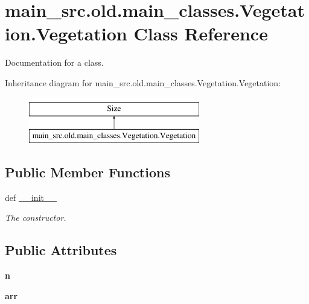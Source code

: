 \hypertarget{classmain__src_8old_1_1main__classes_1_1Vegetation_1_1Vegetation}{\section{main\-\_\-src.\-old.\-main\-\_\-classes.\-Vegetation.\-Vegetation Class Reference}
\label{classmain__src_8old_1_1main__classes_1_1Vegetation_1_1Vegetation}
}


Documentation for a class.  


Inheritance diagram for main\-\_\-src.\-old.\-main\-\_\-classes.\-Vegetation.\-Vegetation\-:\begin{figure}[H]
\begin{center}
\leavevmode
\includegraphics[height=2.000000cm]{classmain__src_8old_1_1main__classes_1_1Vegetation_1_1Vegetation}
\end{center}
\end{figure}
\subsection*{Public Member Functions}
\begin{DoxyCompactItemize}
\item 
def \hyperlink{classmain__src_8old_1_1main__classes_1_1Vegetation_1_1Vegetation_a2febd5ca1055f20d4e46581d9da806da}{\-\_\-\-\_\-init\-\_\-\-\_\-}
\begin{DoxyCompactList}\small\item\em The constructor. \end{DoxyCompactList}\end{DoxyCompactItemize}
\subsection*{Public Attributes}
\begin{DoxyCompactItemize}
\item 
\hypertarget{classmain__src_8old_1_1main__classes_1_1Vegetation_1_1Vegetation_a062777f397a40ebc13ccc6ea6d3190d6}{{\bfseries n}}\label{classmain__src_8old_1_1main__classes_1_1Vegetation_1_1Vegetation_a062777f397a40ebc13ccc6ea6d3190d6}

\item 
\hypertarget{classmain__src_8old_1_1main__classes_1_1Vegetation_1_1Vegetation_a055bdaa2ecb5e7d78c21f146f7dbe170}{{\bfseries arr}}\label{classmain__src_8old_1_1main__classes_1_1Vegetation_1_1Vegetation_a055bdaa2ecb5e7d78c21f146f7dbe170}

\end{DoxyCompactItemize}


